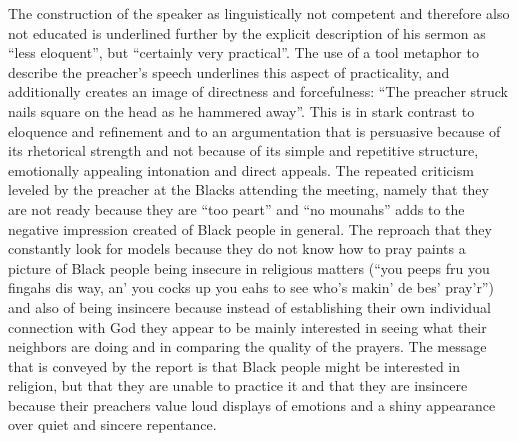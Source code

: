 The construction of the speaker as linguistically not competent and therefore also not educated is underlined further by the explicit description of his sermon as “less eloquent”, but “certainly very practical”. The use of a tool metaphor to describe the preacher’s speech underlines this aspect of practicality, and additionally creates an image of directness and forcefulness: “The preacher struck nails square on the head as he hammered away”. This is in stark contrast to eloquence and refinement and to an argumentation that is persuasive because of its rhetorical strength and not because of its simple and repetitive structure, emotionally appealing intonation and direct appeals. The repeated criticism leveled by the preacher at the Blacks attending the meeting, namely that they are not ready because they are “too peart” and “no mounahs” adds to the negative impression created of Black people in general. The reproach that they constantly look for models because they do not know how to pray paints a picture of Black people being insecure in religious matters (“you peeps fru you fingahs dis way, an’ you cocks up you eahs to see who’s makin’ de bes’ pray’r”) and also of being insincere because instead of establishing their own individual connection with God they appear to be mainly interested in seeing what their neighbors are doing and in comparing the quality of the prayers. The message that is conveyed by the report is that Black people might be interested in religion, but that they are unable to practice it and that they are insincere because their preachers value loud displays of emotions and a shiny appearance over quiet and sincere repentance.


